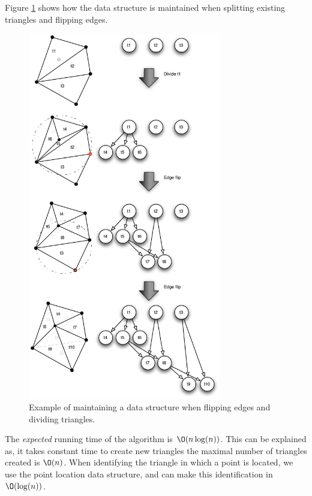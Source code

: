 \documentclass[10pt]{article}
\begin{document}
Figure \ref{fig9} shows how the data structure is maintained when splitting existing triangles and flipping edges.
\begin{figure}[ht]
\centering
\includegraphics[width=0.75\textwidth]{figures/fig9.pdf}
\caption{Example of maintaining a data structure when flipping edges and dividing triangles.}
\label{fig9}
\end{figure}

The \emph{expected} running time of the algorithm is $\O(n\log(n))$. This can be explained as, it takes constant time to create new triangles the maximal number of triangles created is $\O(n)$. When identifying the triangle in which a point is located, we use the point location data structure, and can make this identification in $\O(\log(n))$.



                                       
\end{document}
